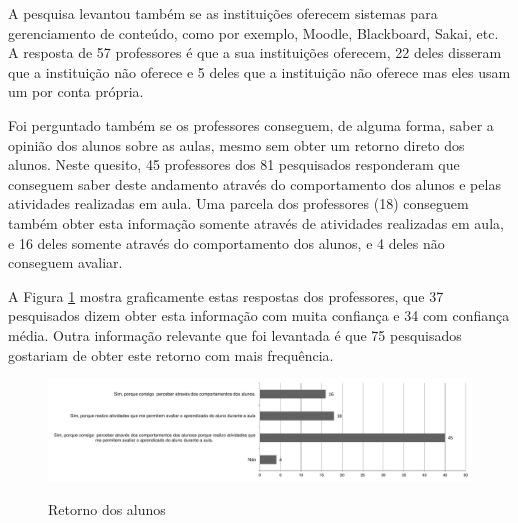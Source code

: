 A pesquisa levantou também se as instituições oferecem sistemas para gerenciamento de conteúdo, como por exemplo, Moodle, Blackboard, Sakai, etc. A resposta de 57 professores é que a sua instituições oferecem, 22 deles disseram que a instituição não oferece e 5 deles que a instituição não oferece mas eles usam um por conta própria. 




Foi perguntado também se os professores conseguem, de alguma forma, saber a opinião dos alunos sobre as aulas, mesmo sem obter um retorno direto dos alunos. Neste quesito, 45 professores dos 81 pesquisados responderam que conseguem saber deste andamento através do comportamento dos alunos e pelas atividades realizadas em aula. Uma parcela dos professores (18) conseguem também obter esta informação somente através de atividades realizadas em aula, e 16 deles somente através do comportamento dos alunos, e 4 deles não conseguem avaliar.

A Figura \ref{fig:grafico_retorno} mostra graficamente estas respostas dos professores, que 37 pesquisados dizem obter esta informação com muita confiança e 34 com confiança média. Outra informação relevante que foi levantada é que 75 pesquisados gostariam de obter este retorno com mais frequência.

\begin{figure}[!h]
\centering
\caption{Retorno dos alunos}
\includegraphics[width=1.0\textwidth]{pdfs/alunos-professores/pesquisa-retorno-alunos.pdf} 
\label{fig:grafico_retorno} 
\end{figure}

